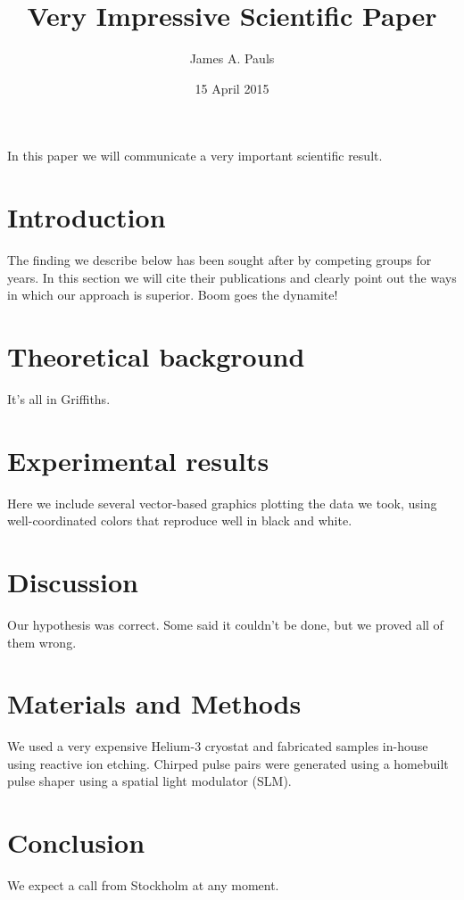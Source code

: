 \documentclass[11pt]{amsart}
\title{Very Impressive Scientific Paper}
\author{James A. Pauls}
\date{15 April 2015}
\begin{document}

In this paper we will communicate a very important scientific result.

\section{Introduction}

The finding we describe below has been sought after by competing groups
for years. In this section we will cite their publications and clearly
point out the ways in which our approach is superior. Boom goes the dynamite!

\section{Theoretical background}

It's all in Griffiths.

\section{Experimental results}

Here we include several vector-based graphics plotting the data we
took, using well-coordinated colors that reproduce well in black and
white.

\section{Discussion}

Our hypothesis was correct. Some said it couldn't be done, but we
proved all of them wrong.

\section{Materials and Methods}

We used a very expensive Helium-3 cryostat and fabricated samples
in-house using reactive ion etching. Chirped pulse pairs were
generated using a homebuilt pulse shaper using a spatial light
modulator (SLM).

\section{Conclusion}

We expect a call from Stockholm at any moment.
\end{document}

